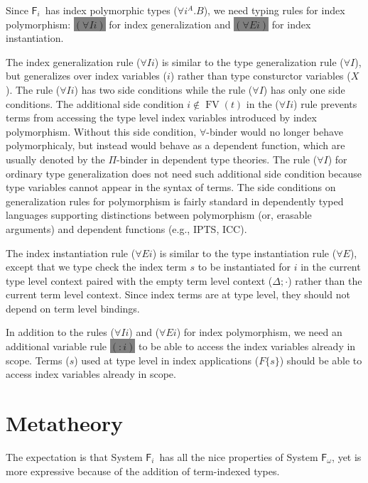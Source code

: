\documentclass{llncs}
\newcommand{\newFi}[1]{\colorbox{grey}{\ensuremath{#1}}}
\newcommand{\eg}{{e.g.}}
\newcommand{\Fi}{\ensuremath{\mathsf{F}_i}}
\newcommand{\Fw}{\ensuremath{\mathsf{F}_\omega}}
\newcommand{\FV}{\mathop{\mathrm{FV}}}
\begin{document}
Since \Fi\ has index polymorphic types ($\forall i^A . B$),
we need typing rules for index polymorphism:
\newFi{(\forall I i)} for index generalization
and \newFi{(\forall E i)} for index instantiation.

The index generalization rule ($\forall I i$) is similar to
the type generalization rule ($\forall I$), but generalizes over
index variables ($i$) rather than type consturctor variables ($X$).
The rule ($\forall I i$) has two side conditions
while the rule ($\forall I$) has only one side conditions.
The additional side condition $i\notin\FV(t)$ in the ($\forall I i$) rule
prevents terms from accessing the type level index variables introduced by
index polymorphism. Without this side condition, $\forall$-binder
would no longer behave polymorphicaly, but instead would behave as
a dependent function, which are usually denoted by the $\Pi$-binder in
dependent type theories. The rule ($\forall I$) for ordinary
type generalization does not need such additional side condition
because type variables cannot appear in the syntax of terms.
The side conditions on generalization rules for polymorphism is fairly standard
in dependently typed languages supporting distinctions between polymorphism
(or, erasable arguments) and dependent functions (\eg, IPTS\cite{LingerS08},
ICC\cite{Miquel01}).

The index instantiation rule ($\forall E i$) is similar to
the type instantiation rule ($\forall E$), except that
we type check the index term $s$ to be instantiated for $i$
in the current type level context paired with the empty term level context
($\Delta;\cdot$) rather than the current term level context.
Since index terms are at type level, they should not depend on
term level bindings.

In addition to the rules ($\forall I i$) and ($\forall E i$) for
index polymorphism, we need an additional variable rule \newFi{(:i)}
to be able to access the index variables already in scope. Terms ($s$) used
at type level in index applications ($F\{s\}$) should be able to access
index variables already in scope. 

\section{Metatheory} \label{sec:theory}

The expectation is that System \Fi\ has all the nice properties of System \Fw,
yet is more expressive because of the addition of term-indexed types.
\end{document}
